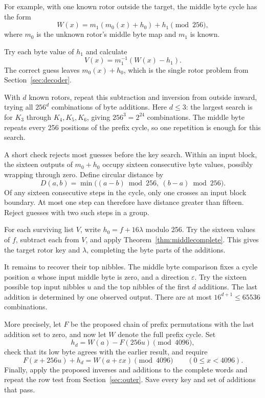 \documentclass[11pt]{article}
\begin{document}
For example, with one known rotor outside the target, the middle byte
cycle has the form
\[
 W(x)=m_1(m_0(x)+h_0)+h_1\pmod {256},
\]
where \(m_0\) is the unknown rotor's middle byte map and \(m_1\) is
known.

Try each byte value of \(h_1\) and calculate
\[
 V(x)=m_1^{-1}(W(x)-h_1).
\]
The correct guess leaves \(m_0(x)+h_0\), which is the single rotor
problem from Section~\ref{sec:decoder}.

With \(d\) known rotors, repeat this subtraction and inversion from
outside inward, trying all \(256^d\) combinations of byte additions.
Here \(d\le3\): the largest search is for \(K_3\) through
\(K_4,K_5,K_6\), giving \(256^3=2^{24}\) combinations.
The middle byte repeats every 256 positions of the prefix cycle, so
one repetition is enough for this search.

A short check rejects most guesses before the key search. Within an
input block, the sixteen outputs of \(m_0+h_0\) occupy sixteen consecutive
byte values, possibly wrapping through zero. Define circular distance by
\[
 D(a,b)=\min\bigl((a-b)\bmod256,\ (b-a)\bmod256\bigr).
\]
Of any sixteen consecutive steps in the cycle, only one crosses an
input block boundary. At most one step can therefore have distance
greater than fifteen. Reject guesses with two such steps in a group.

For each surviving list \(V\), write \(h_0=f+16\lambda\) modulo 256.
Try the sixteen values of \(f\), subtract each from \(V\), and apply
Theorem~\ref{thm:middlecomplete}. This gives the target rotor key and
\(\lambda\), completing the byte parts of the additions.

It remains to recover their top nibbles. The middle byte comparison
fixes a cycle position \(a\) whose input middle byte is zero, and a
direction \(\varepsilon\). Try the sixteen possible top input nibbles
\(u\) and the top nibbles of the first \(d\) additions. The last addition
is determined by one observed output. There are at most
\(16^{d+1}\le65536\) combinations.

More precisely, let \(F\) be the proposed chain of prefix permutations
with the last addition set to zero, and now let \(W\) denote the full
prefix cycle. Set
\[
 h_d=W(a)-F(256u)\pmod {4096},
\]
check that its low byte agrees with the earlier result, and require
\[
 F(x+256u)+h_d=W(a+\varepsilon x)\pmod {4096}
 \qquad(0\le x<4096).
\]
Finally, apply the proposed inverses and additions to the complete
words and repeat the row test from Section~\ref{sec:outer}. Save every
key and set of additions that pass.
\end{document}
